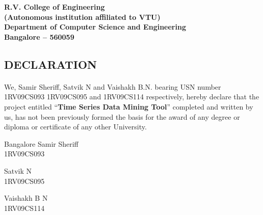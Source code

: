 \documentclass[12pt,a4paper]{report}
\begin{document}
\begin{center}
\textbf{R.V. College of Engineering}\\
\textbf{\scriptsize{(Autonomous institution affiliated to VTU)}}\\
\textbf{Department of Computer Science and Engineering}\\
\textbf{\small{Bangalore -- 560059}}\\
\end{center}


\begin{titlepage}
\begin{center}
\section*{DECLARATION}
\end{center}

\paragraph{}  We, Samir Sheriff, Satvik N and Vaishakh B.N. bearing USN number 1RV09CS093 1RV09CS095 and 1RV09CS114 respectively, hereby declare that the project entitled ``\textbf{Time Series Data Mining Tool}'' completed and written by us, has not been previously formed the basis for the award of any degree or diploma or certificate of any other University.
\vspace{1in}

\begin{flushright} {Bangalore \hspace{4in} Samir Sheriff } \\
 {1RV09CS093}
 \end{flushright}

\begin{flushright} { Satvik N } \\
 {1RV09CS095}
 \end{flushright}

\begin{flushright} { Vaishakh B N } \\
 {1RV09CS114}
 \end{flushright}

\end{titlepage}
\end{document}

